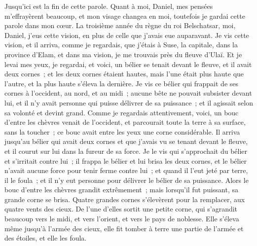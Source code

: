 \begin{multicols}{2}
Jusqu'ici est la fin de cette parole. Quant à moi, Daniel, mes pensées m'effrayèrent beaucoup, et mon visage changea en moi, toutefois je gardai cette parole dans mon cœur.
\VerseOne{}La troisième année du règne du roi Belschatsar, moi, Daniel, j'eus cette vision, en plus de celle que j'avais eue auparavant.
Je vis cette vision, et il arriva, comme je regardais, que j'étais à Suse, la capitale, dans la province d'Elam, et dans ma vision, je me trouvais près du fleuve d'Ulaï.
Et je levai mes yeux, je regardai, et voici, un bélier se tenait devant le fleuve, et il avait deux cornes~; et les deux cornes étaient hautes, mais l'une était plus haute que l'autre, et la plus haute s'éleva la dernière.
Je vis ce bélier qui frappait de ses cornes à l'occident, au nord, et au midi~; aucune bête ne pouvait subsister devant lui, et il n'y avait personne qui puisse délivrer de sa puissance~; et il agissait selon sa volonté et devint grand.
Comme je regardais attentivement, voici, un bouc d'entre les chèvres venait de l'occident, et parcourait toute la terre à sa surface, sans la toucher~; ce bouc avait entre les yeux une corne considérable.
Il arriva jusqu'au bélier qui avait deux cornes et que j'avais vu se tenant devant le fleuve, et il courut sur lui dans la fureur de sa force.
Je le vis qui s'approchait du bélier et s'irritait contre lui~; il frappa le bélier et lui brisa les deux cornes, et le bélier n'avait aucune force pour tenir ferme contre lui~; et quand il l'eut jeté par terre, il le foula~; et il n'y eut personne pour délivrer le bélier de sa puissance.
Alors le bouc d'entre les chèvres grandit extrêmement~; mais lorsqu'il fut puissant, sa grande corne se brisa. Quatre grandes cornes s'élevèrent pour la remplacer, aux quatre vents des cieux.
De l'une d'elles sortit une petite corne, qui s'agrandit beaucoup vers le midi, et vers l'orient, et vers le pays de noblesse.
Elle s'éleva même jusqu'à l'armée des cieux, elle fit tomber à terre une partie de l'armée et des étoiles, et elle les foula.

\end{multicols}
